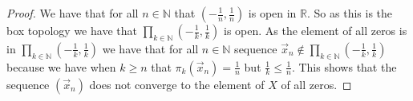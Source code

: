 \documentclass{amsart}
\theoremstyle{plain}
\theoremstyle{definition}
\theoremstyle{remark}
\begin{document}
 \begin{proof}
    We have that for all $n\in \mathbb{N}$ that $(-\frac{1}{n},\frac{1}{n})$ is open in $\mathbb{R}$. So as this is the box topology we have that $\prod_{k\in\mathbb{N}}(-\frac{1}{k},\frac{1}{k})$ is open. As the element of all zeros is in $\prod_{k\in\mathbb{N}}(-\frac{1}{k},\frac{1}{k})$ we have that for all $n \in \mathbb{N}$ sequence $\vec{x}_n\not \in  \prod_{k\in\mathbb{N}}(-\frac{1}{k},\frac{1}{k})$ because we have when $k\geq n$ that $\pi_k(\vec{x}_n)=\frac{1}{n}$ but $\frac{1}{k}\leq \frac{1}{n}$. This shows that the sequence $(\vec{x}_n)$ does not converge to the element of $X$ of all zeros.

 \end{proof}

 
\end{document}
